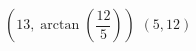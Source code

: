 { $\left( 13, \arctan \left( \dfrac{12}{5} \right) \right)$ \label{polartorectlast}}
{ $\left( 5, 12 \right)$ }
